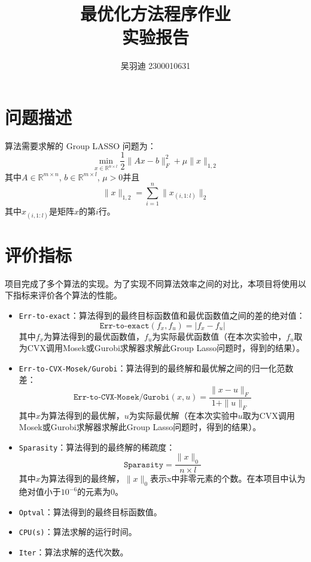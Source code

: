 \documentclass[a4paper,12pt]{ctexart}
\title{
	\vspace{2cm} %
	\vspace{1cm} %
	\textbf{\Huge 最优化方法程序作业\\实验报告} \\
	\vspace{1cm} %
	\vspace{0.5cm} %
}
\author{吴羽迪   2300010631}
\date{}
\begin{document}
	
	\maketitle
	\thispagestyle{empty}
	\newpage
	
	\setcounter{page}{1}  %
	\tableofcontents
	\newpage
	
	\section{问题描述}
	算法需要求解的 Group LASSO 问题为：
	\begin{equation}
		\min_{x \in \mathbb{R}^{n \times l}} \frac{1}{2} \|Ax - b\|_F^2 + \mu \|x\|_{1,2}
		\label{eq.1}
	\end{equation}
	其中$A \in \mathbb{R}^{m \times n}$, $b \in \mathbb{R}^{m \times l}$, $\mu >0$并且
	\[
	\|x\|_{1,2} = \sum_{i=1}^n\|x_{(i,1:l)}\|_2
	\]
	其中$x_{(i,1:l)}$是矩阵$x$的第$i$行。
	
	\section{评价指标}
	项目完成了多个算法的实现。为了实现不同算法效率之间的对比，本项目将使用以下指标来评价各个算法的性能。
	
	\begin{itemize}
		\item \texttt{Err-to-exact}：算法得到的最终目标函数值和最优函数值之间的差的绝对值：
		$$
		\texttt{Err-to-exact}(f_x, f_u) = |f_x - f_u|
		$$
		其中$f_x$为算法得到的最优函数值，$f_u$为实际最优函数值（在本次实验中，$f_u$取为CVX调用Mosek或Gurobi求解器求解此Group Lasso问题时，得到的结果）。
		\item \texttt{Err-to-CVX-Mosek/Gurobi}：算法得到的最终解和最优解之间的归一化范数差：
		$$
		\texttt{Err-to-CVX-Mosek/Gurobi}(x,u) = \frac{\|x - u\|_F}{1 + \|u\|_F}
		$$
		其中$x$为算法得到的最优解，$u$为实际最优解（在本次实验中$u$取为CVX调用Mosek或Gurobi求解器求解此Group Lasso问题时，得到的结果）。
		\item \texttt{Sparasity}：算法得到的最终解的稀疏度：
		$$
		\texttt{Sparasity} = \frac{\|x\|_0}{n \times l}
		$$
		其中$x$为算法得到的最终解，$\|x\|_0$表示x中非零元素的个数。在本项目中认为绝对值小于$10^{-6}$的元素为0。
		\item \texttt{Optval}：算法得到的最终目标函数值。
		\item \texttt{CPU(s)}：算法求解的运行时间。
		\item \texttt{Iter}：算法求解的迭代次数。	
	\end{itemize}
	
\end{document}
